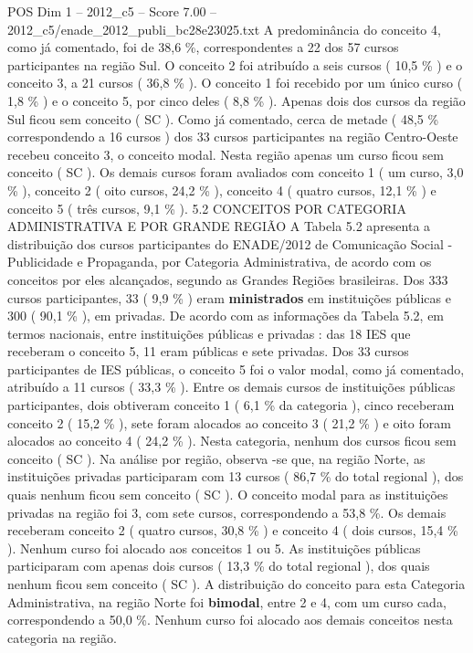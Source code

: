 \begin{textsample}{POS Dim 1 – 2012\_c5 – Score 7.00 – 2012\_c5/enade\_2012\_publi\_bc28e23025.txt}
A predominância do conceito 4, como já comentado, foi de 38,6 \%, correspondentes a 22 dos 57 cursos participantes na região Sul.
O conceito 2 foi atribuído a seis cursos ( 10,5 \% ) e o conceito 3, a 21 cursos ( 36,8 \% ).
O conceito 1 foi recebido por um único curso ( 1,8 \% ) e o conceito 5, por cinco deles ( 8,8 \% ).
Apenas dois dos cursos da região Sul ficou sem conceito ( SC ).
Como já comentado, cerca de metade ( 48,5 \% correspondendo a 16 cursos ) dos 33 cursos participantes na região Centro-Oeste recebeu conceito 3, o conceito modal.
Nesta região apenas um curso ficou sem conceito ( SC ).
Os demais cursos foram avaliados com conceito 1 ( um curso, 3,0 \% ), conceito 2 ( oito cursos, 24,2 \% ), conceito 4 ( quatro cursos, 12,1 \% ) e conceito 5 ( três cursos, 9,1 \% ). 5.2 CONCEITOS POR CATEGORIA ADMINISTRATIVA E POR GRANDE REGIÃO A Tabela 5.2 apresenta a distribuição dos cursos participantes do ENADE/2012 de Comunicação Social - Publicidade e Propaganda, por Categoria Administrativa, de acordo com os conceitos por eles alcançados, segundo as Grandes Regiões brasileiras.
Dos 333 cursos participantes, 33 ( 9,9 \% ) eram \textbf{ministrados} em instituições públicas e 300 ( 90,1 \% ), em privadas.
De acordo com as informações da Tabela 5.2, em termos nacionais, entre instituições públicas e privadas : das 18 IES que receberam o conceito 5, 11 eram públicas e sete privadas.
Dos 33 cursos participantes de IES públicas, o conceito 5 foi o valor modal, como já comentado, atribuído a 11 cursos ( 33,3 \% ).
Entre os demais cursos de instituições públicas participantes, dois obtiveram conceito 1 ( 6,1 \% da categoria ), cinco receberam conceito 2 ( 15,2 \% ), sete foram alocados ao conceito 3 ( 21,2 \% ) e oito foram alocados ao conceito 4 ( 24,2 \% ).
Nesta categoria, nenhum dos cursos ficou sem conceito ( SC ).
Na análise por região, observa -se que, na região Norte, as instituições privadas participaram com 13 cursos ( 86,7 \% do total regional ), dos quais nenhum ficou sem conceito ( SC ).
O conceito modal para as instituições privadas na região foi 3, com sete cursos, correspondendo a 53,8 \%.
Os demais receberam conceito 2 ( quatro cursos, 30,8 \% ) e conceito 4 ( dois cursos, 15,4 \% ).
Nenhum curso foi alocado aos conceitos 1 ou 5.
As instituições públicas participaram com apenas dois cursos ( 13,3 \% do total regional ), dos quais nenhum ficou sem conceito ( SC ).
A distribuição do conceito para esta Categoria Administrativa, na região Norte foi \textbf{bimodal}, entre 2 e 4, com um curso cada, correspondendo a 50,0 \%.
Nenhum curso foi alocado aos demais conceitos nesta categoria na região.

\end{textsample}
